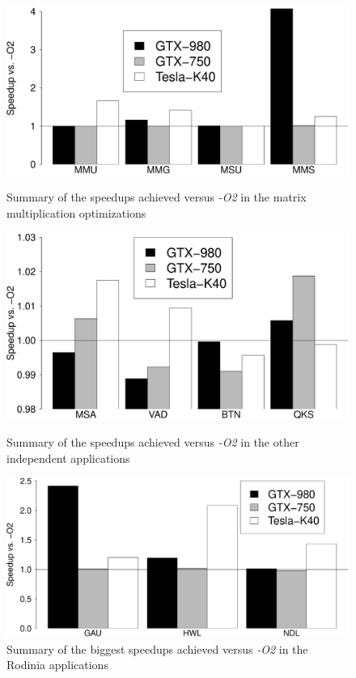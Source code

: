 \begin{figure}[htpb]
    \centering
    \begin{minipage}{.48\textwidth}
        \centering
        \includegraphics[scale=.15]{./images/MatrixSummary.eps}
        \caption{Summary of the speedups achieved versus \emph{-O2} in the matrix multiplication optimizations}
        \label{fig:matrixsummary}
    \end{minipage}%
    \hfill
    \begin{minipage}{.48\textwidth}
        \centering
        \includegraphics[scale=.15]{./images/Summary.eps}
        \caption{Summary of the speedups achieved versus \emph{-O2} in the other independent applications}
        \label{fig:summary}
    \end{minipage}%
    \hfill
    \begin{minipage}{\textwidth}
        \centering
        \includegraphics[scale=.15]{./images/RodiniaSummary.eps}
        \caption{Summary of the biggest speedups achieved versus \emph{-O2} in the Rodinia applications}
        \label{fig:rodiniasummary}
    \end{minipage}%


\end{figure}
